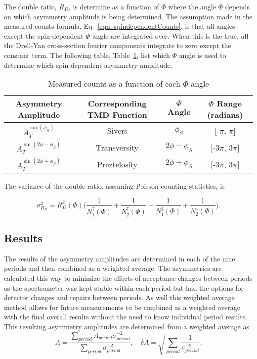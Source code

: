 The double ratio, $R_D$, is determine as a function of $\Phi$ where the angle
$\Phi$ depends on which asymmetry amplitude is being determined.  The assumption
made in the measured counts formula, Eq.~\ref{equ::spindependentCounts}, is that
all angles except the spin-dependent $\Phi$ angle are integrated over.  When
this is the true, all the Drell-Yan cross-section fourier components integrate
to zero except the constant term.  The following table,
Table~\ref{tab::ratio_phiAngles}, list which $\Phi$ angle is used to determine
which spin-dependent asymmetry amplitude.

\begin{table}[h!t]
  \centering
  \caption{Measured counts as a function of each $\Phi$ angle}
  \begin{tabular}{ |c|c|c|c| }
    \hline \textbf{Asymmetry Amplitude}& \textbf{Corresponding TMD Function}&
    \textbf{$\Phi$ Angle}& \textbf{$\Phi$ Range (radians)} \\ \hline
    
    $A^{\sin(\phi_S)}_T$& Sivers& $\phi_S$& [-$\pi$, $\pi$] \\ \hline

    $A^{\sin(2\phi-\phi_S)}_T$& Transversity& $2\phi-\phi_S$& [-3$\pi$, 3$\pi$]
    \\ \hline

    $A^{\sin(2\phi+\phi_S)}_T$& Preztelosity& $2\phi+\phi_S$& [-3$\pi$, 3$\pi$]
    \\ \hline
  \end{tabular}
    \label{tab::ratio_phiAngles}
\end{table}

The variance of the double ratio, assuming Poisson counting statistics, is

\begin{equation}
  \sigma^2_{R_D} = R^2_D(\Phi)\Big(\frac{1}{N_1^\uparrow(\Phi)}
    + \frac{1}{N_2^\uparrow(\Phi)}
    + \frac{1}{N_1^\downarrow(\Phi)}
    +\frac{1}{N_2^\downarrow(\Phi)}
   \Big).
\end{equation}

\subsection{Results}\label{sec::doubleratio_results}
The results of the asymmetry amplitudes are determined in each of the nine
periods and then combined as a weighted average.  The asymmetries are calculated
this way to minimize the effects of acceptance changes between periods as the
spectrometer was kept stable within each period but had the options for detector
changes and repairs between periods.  As well this weighted average method
allows for future measurements to be combined as a weighted average with the
final overall results without the need to know individual period results.  This
resulting asymmetry amplitudes are determined from a weighted average as
\begin{equation}
  \label{equ::wAvg}
  A = \frac{
    \sum_{period}
  A_{period}\sigma^{-2}_{period}
  }{
    \sum_{period} \sigma^{-2}_{period}
    },
  \quad \delta A = \sqrt{\sum_{period}
  \frac{1}{\sigma^{-2}_{period}}}.
\end{equation}

